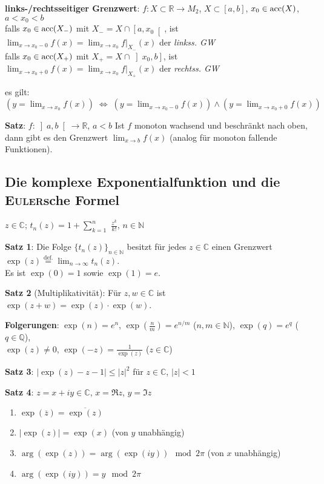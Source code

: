 \linie

\textbf{links-/rechtsseitiger Grenzwert}:
$f: X \subset \mathbb{R} \rightarrow M_2$, $X \subset [a,b]$,
$x_0 \in \operatorname{acc}(X)$, $a < x_0 < b$ \\
falls $x_0 \in \operatorname{acc}(X_-)$ mit $X_- = X \cap \left[a,x_0\right[$, ist
$\lim_{x \to x_0 - 0} f(x) = \lim_{x \to x_0} f|_{X_-}(x)$ der
\emph{linkss. GW} \\
falls $x_0 \in \operatorname{acc}(X_+)$ mit $X_+ = X \cap \left]x_0,b\right]$, ist
$\lim_{x \to x_0 + 0} f(x) = \lim_{x \to x_0} f|_{X_+}(x)$ der
\emph{rechtss. GW}

es gilt: $(y = \lim_{x \to x_0} f(x)) \;\Leftrightarrow\;
(y = \lim_{x \to x_0 - 0} f(x)) \land (y = \lim_{x \to x_0 + 0} f(x))$

\textbf{Satz}: $f: \left]a,b\right[ \rightarrow \mathbb{R}$, $a < b$ \qquad
Ist $f$ monoton wachsend und beschränkt nach oben, dann gibt es den Grenzwert
$\lim_{x \to b} f(x)$
(analog für monoton fallende Funktionen).

\subsection{%
    Die komplexe Exponentialfunktion und die \textsc{Euler}sche Formel%
}

$z \in \mathbb{C}$; \quad $t_n(z) = 1 + \sum_{k=1}^n$
{\large $\frac{z^k}{k!}$}, \quad $n \in \mathbb{N}$

\textbf{Satz 1}: Die Folge $\{t_n(z)\}_{n \in \mathbb{N}}$ besitzt für jedes
$z \in \mathbb{C}$ einen Grenzwert
$\exp(z) \overset{\text{def.}}{=} \lim_{n \to \infty} t_n(z)$. \\
Es ist $\exp(0) = 1$ sowie $\exp(1) = e$.

\textbf{Satz 2} (Multiplikativität): Für $z, w \in \mathbb{C}$ ist
$\exp(z + w) = \exp(z) \cdot \exp(w)$.

\textbf{Folgerungen}: $\exp(n) = e^n$, $\exp(\frac{n}{m}) = e^{n/m}$
($n, m \in \mathbb{N}$), $\exp(q) = e^q$ ($q \in \mathbb{Q}$), \\
$\exp(z) \not= 0$, $\exp(-z) = \frac{1}{\exp(z)}$ ($z \in \mathbb{C}$)

\textbf{Satz 3}: $|\exp(z) - z - 1| \le |z|^2$ für $z \in \mathbb{C}$,
$|z| < 1$

\textbf{Satz 4}: $z = x + iy \in \mathbb{C}$, $x = \Re z$, $y = \Im z$

\begin{enumerate}
    \item $\exp(\overline{z}) = \overline{\exp(z)}$
    
    \item $|\exp(z)| = \exp(x)$ \quad (von $y$ unabhängig)
    
    \item $\arg(\exp(z)) = \arg(\exp(iy)) \mod 2\pi$ \quad (von $x$ unabhängig)
    
    \item $\arg(\exp(iy)) = y \mod 2\pi$
\end{enumerate}

